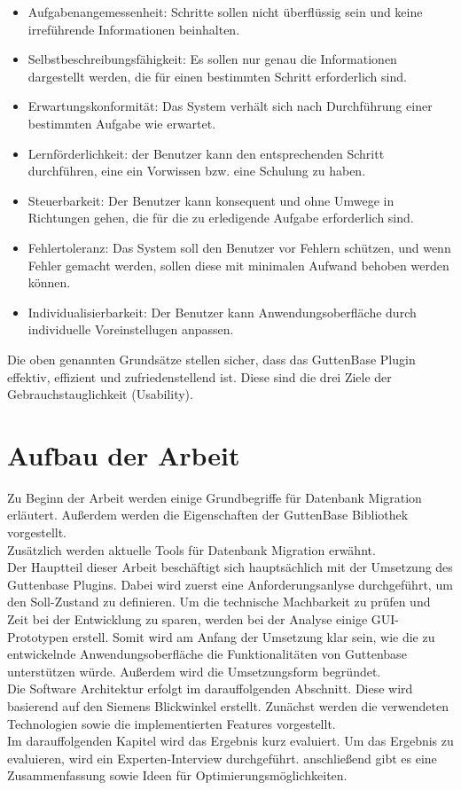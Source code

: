 \begin{itemize}
	\item Aufgabenangemessenheit:
	Schritte sollen nicht überflüssig sein und keine irreführende Informationen beinhalten.
	
	\item Selbstbeschreibungsfähigkeit:
	Es sollen nur genau die Informationen dargestellt werden, die für einen bestimmten Schritt erforderlich sind.
	
	\item Erwartungskonformität:
	Das System verhält sich nach Durchführung einer bestimmten Aufgabe wie erwartet.
	
	\item Lernförderlichkeit:
	der Benutzer kann den entsprechenden Schritt durchführen, eine ein Vorwissen bzw. eine Schulung zu haben.
	
	\item Steuerbarkeit:
	Der Benutzer kann konsequent und ohne Umwege in Richtungen gehen, die für die zu erledigende Aufgabe erforderlich sind.
	
	\item Fehlertoleranz:
	Das System soll den Benutzer vor Fehlern schützen, und wenn Fehler gemacht werden, sollen diese mit minimalen Aufwand behoben werden können.

	\item Individualisierbarkeit:
	Der Benutzer kann Anwendungsoberfläche durch individuelle Voreinstellugen anpassen.
	
\end{itemize}
Die oben genannten Grundsätze stellen sicher, dass das GuttenBase Plugin effektiv, effizient und zufriedenstellend ist. Diese sind die drei Ziele der Gebrauchstauglichkeit (Usability).

\section{Aufbau der Arbeit}
Zu Beginn der Arbeit werden einige Grundbegriffe für Datenbank Migration erläutert. Außerdem werden die Eigenschaften der GuttenBase Bibliothek vorgestellt.\\
Zusätzlich werden aktuelle Tools für Datenbank Migration erwähnt.\\
Der Hauptteil dieser Arbeit beschäftigt sich hauptsächlich mit der Umsetzung des Guttenbase Plugins. Dabei wird zuerst eine Anforderungsanlyse durchgeführt, um den Soll-Zustand zu definieren. Um die technische Machbarkeit zu prüfen und Zeit bei der Entwicklung zu sparen, werden bei der Analyse einige GUI-Prototypen erstell. Somit wird am Anfang der Umsetzung klar sein, wie die zu entwickelnde Anwendungsoberfläche die Funktionalitäten von Guttenbase unterstützen würde. Außerdem wird die Umsetzungsform begründet. \\
Die Software Architektur erfolgt im darauffolgenden Abschnitt. Diese wird basierend auf den Siemens Blickwinkel erstellt. Zunächst werden die verwendeten Technologien sowie die implementierten Features vorgestellt.\\
Im darauffolgenden Kapitel wird das Ergebnis kurz evaluiert.
Um das Ergebnis zu evaluieren, wird ein Experten-Interview durchgeführt.
anschließend gibt es eine Zusammenfassung sowie Ideen für Optimierungsmöglichkeiten.